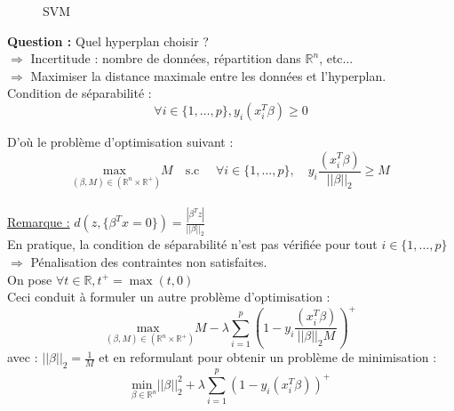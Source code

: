 \documentclass[12pt,a4paper]{article}
\begin{document}
\begin{figure}
    \centering
    
    \caption{SVM}
    \label{fig:SVM}
\end{figure}

\textbf{Question :} Quel hyperplan choisir ?\\
$\Rightarrow$ Incertitude : nombre de données, répartition dans $\mathbb{R}^n$, etc...\\
$\Rightarrow$ Maximiser la distance maximale entre les données et l'hyperplan.\\

Condition de séparabilité :\\
$$
\forall i \in \{1, \dots, p\}, y_i (x_i^T \beta) \geq 0
$$

D'où le problème d'optimisation suivant :\\
\begin{equation}
    \underset{(\beta, M) \in (\mathbb{R}^n \times \mathbb{R}^+)}{\text{max }} M \quad \text{s.c } \quad \forall i \in \{1, \dots, p\}, \quad y_i \frac{(x_i^T \beta)}{||\beta||_2} \geq M
\end{equation}\\


\underline{Remarque :} $d(z, \{\beta^Tx=0\}) = \frac{|\beta^Tz|}{||\beta||_2}$\\

En pratique, la condition de séparabilité n'est pas vérifiée pour tout $i \in \{1, \dots, p\}$\\
$\Rightarrow$ Pénalisation des contraintes non satisfaites.\\
On pose $\forall t \in \mathbb{R}, t^+ = \max(t, 0)$\\

Ceci conduit à formuler un autre problème d'optimisation :\\
\begin{equation}
    \underset{(\beta, M) \in (\mathbb{R}^n \times \mathbb{R}^+)}{\text{max }} M - \lambda \sum_{i=1}^p (1 - y_i \frac{(x_i^T \beta)}{||\beta||_2 M})^+
\end{equation}
avec : $||\beta||_2 = \frac{1}{M}$ et en reformulant pour obtenir un problème de minimisation :\\

\begin{equation}
    \underset{\beta \in \mathbb{R}^n}{\text{min }} ||\beta||_2^2 + \lambda  \sum_{i=1}^p (1 - y_i (x_i^T \beta))^+
\end{equation}
\end{document}
